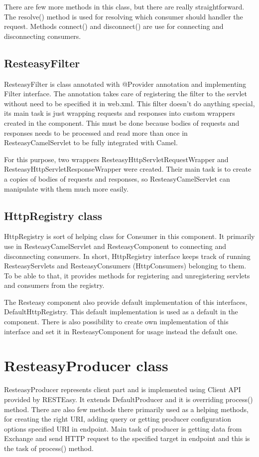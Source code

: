 \documentclass[12pt,final,oneside]{fithesis2}
\begin{document}
There are few more methods in this class, but there are really straightforward. The resolve() method is used for resolving which consumer should handler the request. Methods connect() and disconnect() are use for connecting and disconnecting consumers. 

\subsection*{ResteasyFilter}
ResteasyFilter is class annotated with @Provider annotation and implementing Filter interface. The annotation takes care of registering the filter to the servlet without need to be specified it in web.xml. This filter doesn't do anything special, its main task is just wrapping requests and responses into custom wrappers created in the component. This must be done because bodies of requests and responses needs to be processed and read more than once in ResteasyCamelServlet to be fully integrated with Camel.

For this purpose, two wrappers ResteasyHttpServletRequestWrapper and ResteasyHttpServletResponseWrapper were created. Their main task is to create a copies of bodies of requests and responses, so  ResteasyCamelServlet can manipulate with them much more easily.


\subsection{HttpRegistry class}\label{registry}
HttpRegistry is sort of helping class for Consumer in this component. It primarily use in ResteasyCamelServlet and ResteasyComponent to connecting and disconnecting consumers. In short, HttpRegistry interface keeps track of running ResteasyServlets and ResteasyConsumers (HttpConsumers) belonging to them.  To be able to that, it provides methods for registering and unregistering servlets and consumers from the registry.

The Resteasy component also provide default implementation of this interfaces, DefaultHttpRegistry. This default implementation is used as a default in the component. There is also possibility to create own implementation of this interface and set it in ResteasyComponent for usage instead the default one. 


\section{ResteasyProducer class}
ResteasyProducer represents client part and is implemented using Client API provided by RESTEasy. It extends DefaultProducer and it is overriding process() method. There are also few methods there primarily used as a helping methods, for creating the right URI, adding query or getting producer configuration options specified URI in endpoint. Main task of producer is getting data from Exchange and send HTTP request to the specified target in endpoint and this is the task of process() method. 
\end{document}
